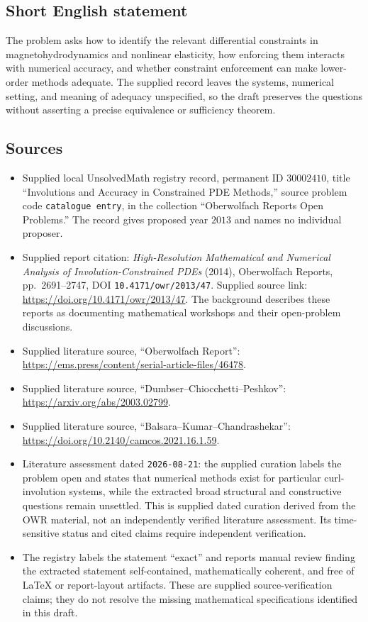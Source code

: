 \documentclass[11pt]{article}
\begin{document}
\subsection{Short English statement}
The problem asks how to identify the relevant differential constraints in magnetohydrodynamics and nonlinear elasticity, how enforcing them interacts with numerical accuracy, and whether constraint enforcement can make lower-order methods adequate. The supplied record leaves the systems, numerical setting, and meaning of adequacy unspecified, so the draft preserves the questions without asserting a precise equivalence or sufficiency theorem.
\subsection{Sources}
\begin{itemize}
\item Supplied local UnsolvedMath registry record, permanent ID \(30002410\), title ``Involutions and Accuracy in Constrained PDE Methods,'' source problem code \texttt{catalogue entry}, in the collection ``Oberwolfach Reports Open Problems.'' The record gives proposed year \(2013\) and names no individual proposer.
\item Supplied report citation: \emph{High-Resolution Mathematical and Numerical Analysis of Involution-Constrained PDEs} (2014), Oberwolfach Reports, pp.~2691--2747, DOI \texttt{10.4171/owr/2013/47}. Supplied source link: \url{https://doi.org/10.4171/owr/2013/47}. The background describes these reports as documenting mathematical workshops and their open-problem discussions.
\item Supplied literature source, ``Oberwolfach Report'': \url{https://ems.press/content/serial-article-files/46478}.
\item Supplied literature source, ``Dumbser--Chiocchetti--Peshkov'': \url{https://arxiv.org/abs/2003.02799}.
\item Supplied literature source, ``Balsara--Kumar--Chandrashekar'': \url{https://doi.org/10.2140/camcos.2021.16.1.59}.
\item Literature assessment dated \texttt{2026-08-21}: the supplied curation labels the problem open and states that numerical methods exist for particular curl-involution systems, while the extracted broad structural and constructive questions remain unsettled. This is supplied dated curation derived from the OWR material, not an independently verified literature assessment. Its time-sensitive status and cited claims require independent verification.
\item The registry labels the statement ``exact'' and reports manual review finding the extracted statement self-contained, mathematically coherent, and free of LaTeX or report-layout artifacts. These are supplied source-verification claims; they do not resolve the missing mathematical specifications identified in this draft.
\end{itemize}
\end{document}
